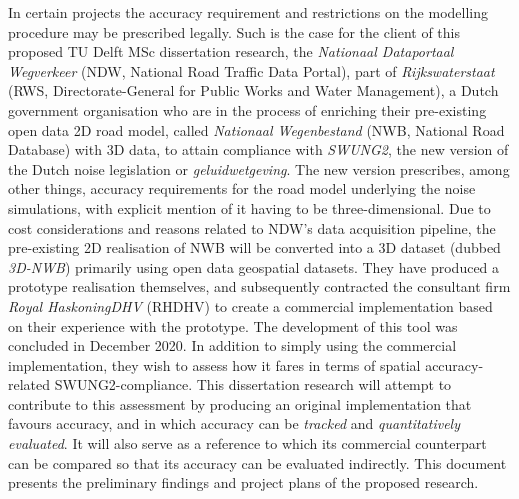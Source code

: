 In certain projects the accuracy requirement and restrictions on the modelling procedure may be prescribed legally. Such is the case for the client of this proposed TU Delft MSc dissertation research, the \textit{Nationaal Dataportaal Wegverkeer} (NDW, National Road Traffic Data Portal), part of \textit{Rijkswaterstaat} (RWS, Directorate-General for Public Works and Water Management), a Dutch government organisation who are in the process of enriching their pre-existing open data 2D road model, called \textit{Nationaal Wegenbestand} (NWB, National Road Database) with 3D data, to attain compliance with \textit{SWUNG2}, the new version of the Dutch noise legislation or \textit{geluidwetgeving}. The new version prescribes, among other things, accuracy requirements for the road model underlying the noise simulations, with explicit mention of it having to be three-dimensional. Due to cost considerations and reasons related to NDW’s data acquisition pipeline, the pre-existing 2D realisation of NWB will be converted into a 3D dataset (dubbed \textit{3D-NWB}) primarily using open data geospatial datasets. They have produced a prototype realisation themselves, and subsequently contracted the consultant firm \textit{Royal HaskoningDHV} (RHDHV) to create a commercial implementation based on their experience with the prototype. The development of this tool was concluded in December 2020. In addition to simply using the commercial implementation, they wish to assess how it fares in terms of spatial accuracy-related SWUNG2-compliance. This dissertation research will attempt to contribute to this assessment by producing an original implementation that favours accuracy, and in which accuracy can be \textit{tracked} and \textit{quantitatively evaluated}. It will also serve as a reference to which its commercial counterpart can be compared so that its accuracy can be evaluated indirectly. This document presents the preliminary findings and project plans of the proposed research.

